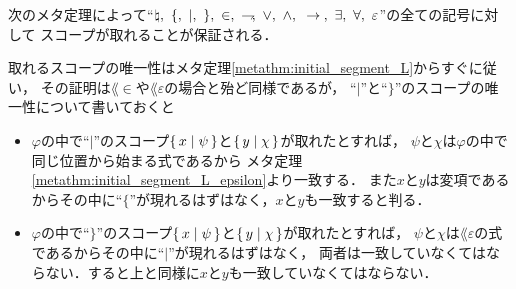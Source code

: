 	次のメタ定理によって``$\natural,\ \{,\ |,\ \},\ \in,\ \negation,\ \vee,
	\ \wedge,\ \rarrow,\ \exists,\ \forall,\ \varepsilon$''の全ての記号に対して
	スコープが取れることが保証される．
	
	取れるスコープの唯一性はメタ定理\ref{metathm:initial_segment_L}からすぐに従い，
	その証明は$\lang{\in}$や$\lang{\varepsilon}$の場合と殆ど同様であるが，
	``$|$''と``$\}$''のスコープの唯一性について書いておくと
	\begin{itemize}
		\item $\varphi$の中で``$|$''のスコープ$\{\, x \mid \psi\, \}$と$\{\, y \mid \chi\, \}$が取れたとすれば，
			$\psi$と$\chi$は$\varphi$の中で同じ位置から始まる式であるから
			メタ定理\ref{metathm:initial_segment_L_epsilon}より一致する．
			また$x$と$y$は変項であるからその中に``$\{$''が現れるはずはなく，$x$と$y$も一致すると判る．
			
		\item $\varphi$の中で``$\}$''のスコープ$\{\, x \mid \psi\, \}$と$\{\, y \mid \chi\, \}$が取れたとすれば，
			$\psi$と$\chi$は$\lang{\varepsilon}$の式であるからその中に``$|$''が現れるはずはなく，
			両者は一致していなくてはならない．すると上と同様に$x$と$y$も一致していなくてはならない．
	\end{itemize}
	
